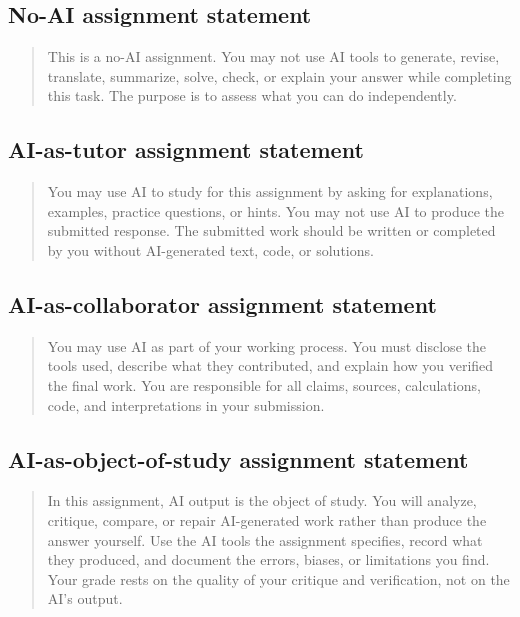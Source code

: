 \documentclass{SIAMbook2023}
\begin{document}
\subsection*{No-AI assignment statement}

\begin{quote}
This is a no-AI assignment. You may not use AI tools to generate, revise, translate, summarize, solve, check, or explain your answer while completing this task. The purpose is to assess what you can do independently.
\end{quote}

\subsection*{AI-as-tutor assignment statement}

\begin{quote}
You may use AI to study for this assignment by asking for explanations, examples, practice questions, or hints. You may not use AI to produce the submitted response. The submitted work should be written or completed by you without AI-generated text, code, or solutions.
\end{quote}

\subsection*{AI-as-collaborator assignment statement}

\begin{quote}
You may use AI as part of your working process. You must disclose the tools used, describe what they contributed, and explain how you verified the final work. You are responsible for all claims, sources, calculations, code, and interpretations in your submission.
\end{quote}

\subsection*{AI-as-object-of-study assignment statement}

\begin{quote}
In this assignment, AI output is the object of study. You will analyze, critique, compare, or repair AI-generated work rather than produce the answer yourself. Use the AI tools the assignment specifies, record what they produced, and document the errors, biases, or limitations you find. Your grade rests on the quality of your critique and verification, not on the AI's output.
\end{quote}
\end{document}
